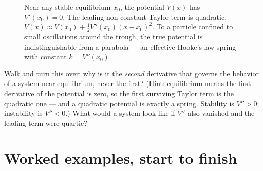 \begin{figure}[H]
\centering
{}
\caption{Near any stable equilibrium $x_0$, the potential
$V(x)$ has $V'(x_0)=0$. The leading non-constant Taylor term is quadratic:
$V(x) \approx V(x_0) + \tfrac12 V''(x_0)(x-x_0)^2$. To a particle confined to small oscillations
around the trough, the true potential is indistinguishable from a parabola --- an effective
Hooke's-law spring with constant $k = V''(x_0)$.}
\label{ch31:fig-potential-well}
\end{figure}

\begin{walkbox}
Walk and turn this over: why is it the \emph{second} derivative that governs the
behavior of a system near equilibrium, never the first? (Hint: equilibrium means the
first derivative of the potential is zero, so the first surviving Taylor term is the
quadratic one --- and a quadratic potential is exactly a spring. Stability is
$V''>0$; instability is $V''<0$.) What would a system look like if $V''$ also
vanished and the leading term were quartic?
\end{walkbox}

\section{Worked examples, start to finish}

